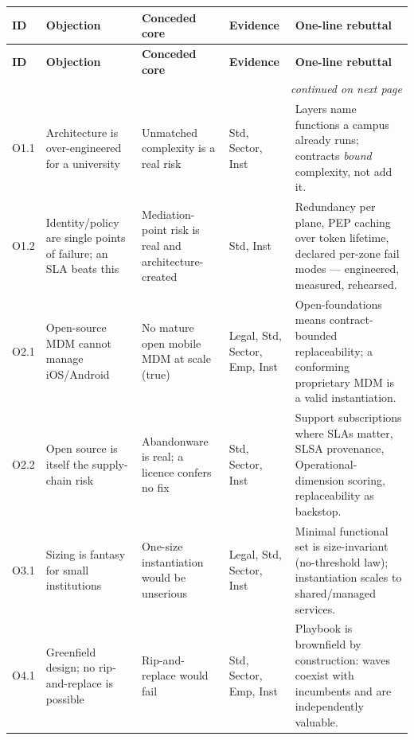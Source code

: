 \documentclass[11pt,a4paper,twoside]{book}
\begin{document}
\renewcommand{\arraystretch}{1.35}
\begin{longtable}{@{}p{}p{}p{}p{}p{}@{}}
\toprule
\textbf{ID} & \textbf{Objection} & \textbf{Conceded core} &
\textbf{Evidence} & \textbf{One-line rebuttal} \\
\midrule
\endfirsthead
\toprule
\textbf{ID} & \textbf{Objection} & \textbf{Conceded core} &
\textbf{Evidence} & \textbf{One-line rebuttal} \\
\midrule
\endhead
\midrule
\multicolumn{5}{r}{\footnotesize\itshape continued on next page}\\
\endfoot
\bottomrule
\endlastfoot

O1.1 & Architecture is over-engineered for a university &
Unmatched complexity is a real risk &
Std, Sector, Inst &
Layers name functions a campus already runs; contracts \emph{bound} complexity, not add it. \\

O1.2 & Identity/policy are single points of failure; an SLA beats this &
Mediation-point risk is real and architecture-created &
Std, Inst &
Redundancy per plane, PEP caching over token lifetime, declared per-zone fail modes --- engineered, measured, rehearsed. \\

O2.1 & Open-source MDM cannot manage iOS/Android &
No mature open mobile MDM at scale (true) &
Legal, Std, Sector, Emp, Inst &
Open-foundations means contract-bounded replaceability; a conforming proprietary MDM is a valid instantiation. \\

O2.2 & Open source is itself the supply-chain risk &
Abandonware is real; a licence confers no fix &
Std, Sector, Inst &
Support subscriptions where SLAs matter, SLSA provenance, Operational-dimension scoring, replaceability as backstop. \\

O3.1 & Sizing is fantasy for small institutions &
One-size instantiation would be unserious &
Legal, Std, Sector, Inst &
Minimal functional set is size-invariant (no-threshold law); instantiation scales to shared/managed services. \\

O4.1 & Greenfield design; no rip-and-replace is possible &
Rip-and-replace would fail &
Std, Sector, Emp, Inst &
Playbook is brownfield by construction: waves coexist with incumbents and are independently valuable. \\


\end{longtable}
\end{document}
